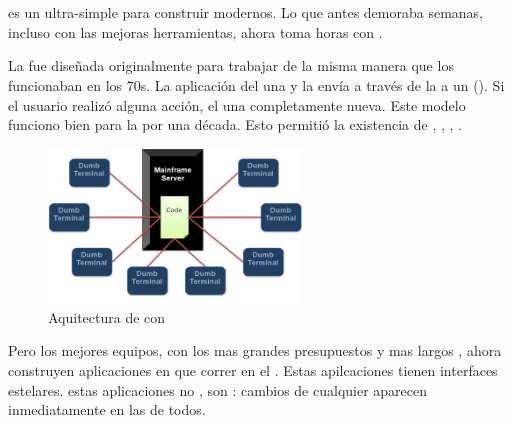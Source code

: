 
\chapter{\meteor}\label{cap:chapter_meteor}


\meteor es un \environment ultra-simple para construir \websites modernos. Lo que antes demoraba semanas, incluso con las mejoras herramientas, ahora toma horas con \meteor.

La \web fue diseñada originalmente para trabajar de la misma manera que los \mainframes funcionaban en los 70s. La aplicación del \serverAS \rendered una \screen y la envía a través de la \network a un \dumbterminal (). Si el usuario realizó alguna acción, el \serverAS \rendered una \screen completamente nueva. Este modelo funciono bien para la \web por una década. Esto permitió la existencia de \lamp, \rails, \django, \php.

\begin{figure}[h!]
	\centering
	\includegraphics[width=0.6\textwidth]{figuras/mainframeServer_dumbterminal.png}
	\caption{Aquitectura de \mainframe con \dumbterminal}
	\label{figure:mainframeServer_dumbterminal}
\end{figure}


Pero los mejores equipos, con los mas grandes presupuestos y mas largos \schedules, ahora construyen aplicaciones en \javaScript que correr en el \client. Estas apilcaciones tienen interfaces estelares. estas aplicaciones no \reload \pages, son \reactive: cambios de cualquier \client aparecen inmediatamente en las \screen de todos.

